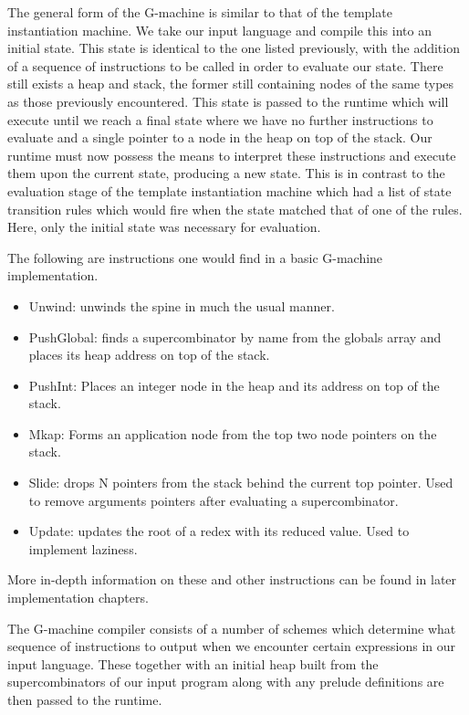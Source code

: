 The general form of the G-machine is similar to that of
the template instantiation machine. We take our input language
and compile this into an initial state. This state is identical
to the one listed previously, with the addition of a sequence
of instructions to be called in order to evaluate our state.
There still exists a heap and stack, the former still containing
nodes of the same types as those previously encountered.
This state is passed to the runtime which will execute until
we reach a final state where we have no further instructions
to evaluate and a single pointer to a node in the heap on top
of the stack. Our runtime must now possess the means to 
interpret these instructions and execute them upon the current
state, producing a new state. This is in contrast to the 
evaluation stage of the template instantiation machine which
had a list of state transition rules which would fire when
the state matched that of one of the rules. Here, only the
initial state was necessary for evaluation.

The following are instructions one would find in a
basic G-machine implementation. 

\begin{itemize}
	\item Unwind: unwinds the spine in much the usual
		  manner.
	\item PushGlobal: finds a supercombinator by name 
		  from the globals array and places its heap
		  address on top of the stack.
	\item PushInt: Places an integer node in the heap
		  and its address on top of the stack.
	\item Mkap: Forms an application node from the
		  top two node pointers on the stack.
	\item Slide: drops N pointers from the stack behind
		  the current top pointer. Used to remove
		  arguments pointers after evaluating a 
		  supercombinator.
	\item Update: updates the root of a redex with its
		  reduced value. Used to implement laziness.
\end{itemize}

\noindent More in-depth information on these and other 
instructions can be found in later implementation chapters. 

The G-machine compiler consists of a number of schemes which
determine what sequence of instructions to output when we
encounter certain expressions in our input language. These
together with an initial heap built from the supercombinators
of our input program along with any prelude definitions are
then passed to the runtime.

